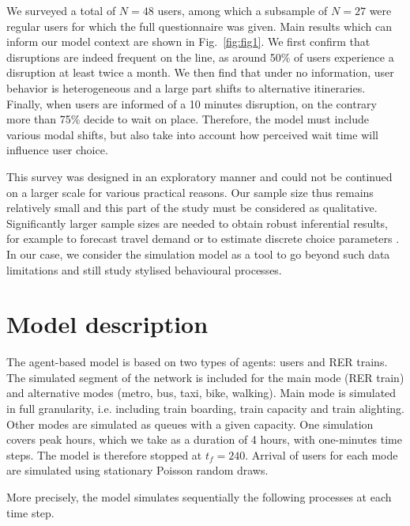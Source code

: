 \documentclass[3p,times,procedia]{elsarticle}
\begin{document}
We surveyed a total of $N=48$ users, among which a subsample of $N=27$ were regular users for which the full questionnaire was given. Main results which can inform our model context are shown in Fig.~\ref{fig:fig1}. We first confirm that disruptions are indeed frequent on the line, as around 50\% of users experience a disruption at least twice a month. We then find that under no information, user behavior is heterogeneous and a large part shifts to alternative itineraries. Finally, when users are informed of a 10 minutes disruption, on the contrary more than 75\% decide to wait on place. Therefore, the model must include various modal shifts, but also take into account how perceived wait time will influence user choice.

This survey was designed in an exploratory manner and could not be continued on a larger scale for various practical reasons. Our sample size thus remains relatively small and this part of the study must be considered as qualitative. Significantly larger sample sizes are needed to obtain robust inferential results, for example to forecast travel demand \citep{horvath2015estimation} or to estimate discrete choice parameters \citep{bliemer2009efficiency}. In our case, we consider the simulation model as a tool to go beyond such data limitations and still study stylised behavioural processes.


\section{Model description}

The agent-based model is based on two types of agents: users and RER trains. The simulated segment of the network is included for the main mode (RER train) and alternative modes (metro, bus, taxi, bike, walking). Main mode is simulated in full granularity, i.e. including train boarding, train capacity and train alighting. Other modes are simulated as queues with a given capacity. One simulation covers peak hours, which we take as a duration of 4 hours, with one-minutes time steps. The model is therefore stopped at $t_f = 240$. Arrival of users for each mode are simulated using stationary Poisson random draws.

More precisely, the model simulates sequentially the following processes at each time step.
\end{document}
